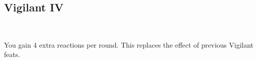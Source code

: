 \subsection*{Vigilant IV}\label{feat:vigilant4}
 \\

You gain 4 extra reactions per round. This replaces the effect
of previous Vigilant feats.
